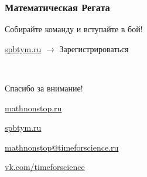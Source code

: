 \documentclass[aspectratio=1610,12pt,notheorems]{beamer}
\begin{document}
\begin{frame} \frametitle{Математическая Регата}
\begin{center}
\vspace{-10mm}
Собирайте команду и вступайте в бой!\vspace{3mm}

		\vspace{3mm}
		
		\url{spbtym.ru} $\rightarrow$ Зарегистрироваться
\end{center}
\end{frame}

\begin{frame} \begin{center}
\ 

	{\Large Спасибо за внимание!} \vspace{0.4cm}

	{\large \url{mathnonstop.ru}}

	{\large \url{spbtym.ru}}

	{\large \url{mathnonstop@timeforscience.ru}}

	{\large \url{vk.com/timeforscience}}
\end{center} \end{frame}
\end{document}
